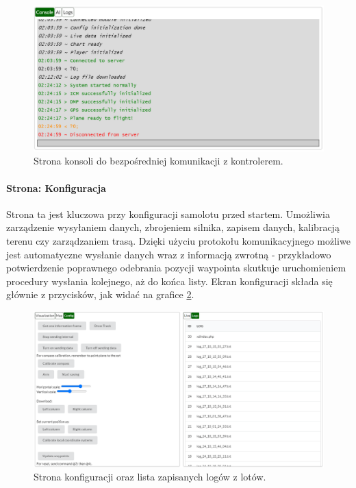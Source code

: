 \documentclass[12pt, a4paper]{article}
\begin{document}
 \begin{figure}[H]
    \centering
    \includegraphics[width=1\textwidth]{konsola}
    \caption{Strona konsoli do bezpośredniej komunikacji z kontrolerem.}
    \label{fig:konsola}
\end{figure}

\paragraph{Strona: Konfiguracja}\mbox{}

Strona ta jest kluczowa przy konfiguracji samolotu przed startem. Umożliwia zarządzenie wysyłaniem danych, zbrojeniem silnika, zapisem danych, kalibracją terenu czy zarządzaniem trasą. Dzięki użyciu protokołu komunikacyjnego możliwe jest automatyczne wysłanie danych wraz z informacją zwrotną - przykładowo potwierdzenie poprawnego odebrania pozycji waypointa skutkuje uruchomieniem procedury wysłania kolejnego, aż do końca listy. Ekran konfiguracji składa się głównie z przycisków, jak widać na grafice \ref{fig:konlog}.

 \begin{figure}[H]
    \centering
    \includegraphics[width=1\textwidth]{config}
    \caption{Strona konfiguracji oraz lista zapisanych logów z lotów.}
    \label{fig:konlog}
\end{figure}
\end{document}

